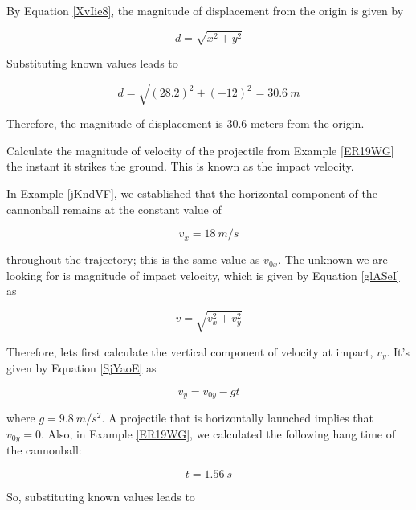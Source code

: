\documentclass[main-physics.tex]{subfiles}
\begin{document}
By Equation \eqref{XvIie8}, the magnitude of displacement from the origin is given by

\begin{equation*}
    d = \sqrt{x^2 + y^2}
\end{equation*}

Substituting known values leads to

\begin{equation*}
    d = \sqrt{\left(28.2\right)^2 + \left(-12\right)^2} = \SI{30.6}{m}
\end{equation*}

Therefore, the magnitude of displacement is 30.6 meters from the origin.

\endsolution

\begin{example}
    Calculate the magnitude of velocity of the projectile from Example \ref{ER19WG} the instant it strikes the ground. This is known as the impact velocity.
\end{example}

\Solution In Example \ref{jKndVF}, we established that the horizontal component of the cannonball remains at the constant value of

\begin{equation*}
    v_x = \SI{18}{m/s}
\end{equation*}

throughout the trajectory; this is the same value as $v_{0x}$. The unknown we are looking for is magnitude of impact velocity, which is given by Equation \eqref{glASeI} as

\begin{equation*}
    v = \sqrt{v_x^2 + v_y^2}
\end{equation*}

Therefore, lets first calculate the vertical component of velocity at impact, $v_y$. It's given by Equation \eqref{SjYaoE} as

\begin{equation*}
    v_y = v_{0y} - gt
\end{equation*}

where $g = \SI{9.8}{m/s^2}$. A projectile that is horizontally launched implies that $v_{0y} = 0$. Also, in Example \ref{ER19WG}, we calculated the following hang time of the cannonball:

\begin{equation*}
    t = \SI{1.56}{s}
\end{equation*}

So, substituting known values leads to 
\end{document}
